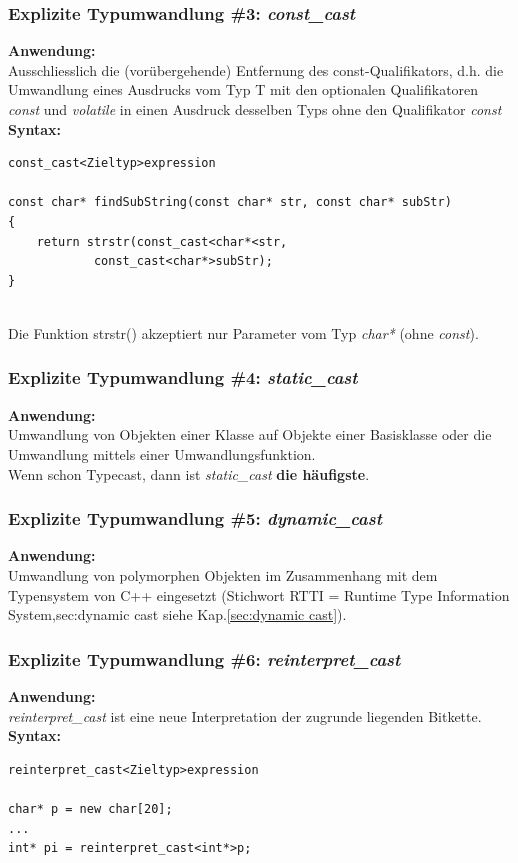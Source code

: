 \subsubsection{Explizite Typumwandlung \#3: \emph{const\_cast}}
\textbf{Anwendung:}\\
Ausschliesslich die (vorübergehende) Entfernung des const-Qualifikators, d.h. die Umwandlung eines Ausdrucks vom Typ T mit den optionalen Qualifikatoren \emph{const} und \emph{volatile} in einen Ausdruck desselben Typs ohne den Qualifikator \emph{const}\\
\textbf{Syntax:}\\
\vspace{-\baselineskip}
\begin{minipage}{0.8\linewidth}
\begin{lstlisting}
const_cast<Zieltyp>expression

const char* findSubString(const char* str, const char* subStr)
{
	return strstr(const_cast<char*<str,
			const_cast<char*>subStr);
}
\end{lstlisting}
\end{minipage}\\
Die Funktion strstr() akzeptiert nur Parameter vom Typ \emph{char*} (ohne \emph{const}).

\subsubsection{Explizite Typumwandlung \#4: \emph{static\_cast}}
\textbf{Anwendung:}\\
Umwandlung von Objekten einer Klasse auf Objekte einer Basisklasse oder die Umwandlung mittels einer Umwandlungsfunktion.\\
Wenn schon Typecast, dann ist \emph{static\_cast} \textbf{die häufigste}.

\subsubsection{Explizite Typumwandlung \#5: \emph{dynamic\_cast}}
\textbf{Anwendung:}\\
Umwandlung von polymorphen Objekten im Zusammenhang mit dem Typensystem von C++ eingesetzt (Stichwort RTTI = Runtime Type Information System,sec:dynamic cast siehe Kap.\ref{sec:dynamic cast}).

\subsubsection{Explizite Typumwandlung \#6: \emph{reinterpret\_cast}}
\textbf{Anwendung:}\\
\emph{reinterpret\_cast} ist eine neue Interpretation der zugrunde liegenden Bitkette.\\
\textbf{Syntax:}\\
\vspace{-\baselineskip}
\begin{minipage}{0.5\linewidth}
\begin{lstlisting}
reinterpret_cast<Zieltyp>expression

char* p = new char[20];
...
int* pi = reinterpret_cast<int*>p;
\end{lstlisting}
\end{minipage}


